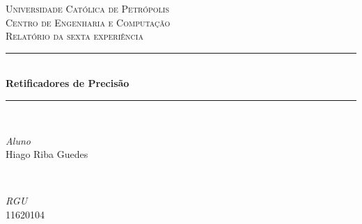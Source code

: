 \documentclass[11pt]{article}
\begin{document}

\begin{titlepage} %
	\newcommand{\HRule}{\rule{\linewidth}{0.5mm}} %
	
	\center %
	
	
	\textsc{\LARGE Universidade Católica de Petrópolis}\\[1.5cm] %
	
	\textsc{\Large Centro de Engenharia e Computação}\\[0.5cm] %
	
	\textsc{\large Relatório da sexta experiência}\\[0.5cm] %
	
	
	\HRule\\[0.4cm]
	
	{\huge\bfseries  Retificadores de Precisão}\\[0.4cm] %
	
	\HRule\\[1.5cm]
	
	
	\begin{minipage}{0.4\textwidth}
		\begin{flushleft}
			\large
			\textit{Aluno}\\
			Hiago Riba Guedes %
		\end{flushleft}
	\end{minipage}
	~
	\begin{minipage}{0.4\textwidth}
		\begin{flushright}
			\large
			\textit{RGU}\\
			11620104 %
		\end{flushright}
	\end{minipage}
	

\end{titlepage}
\end{document}
